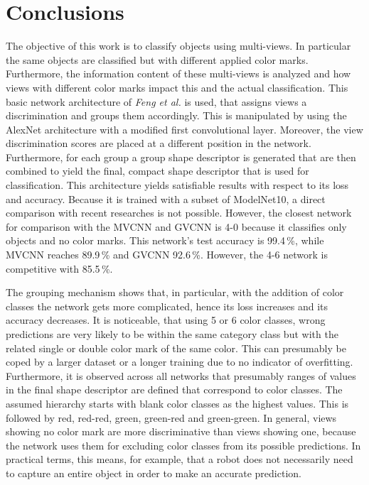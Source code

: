 \section{Conclusions}
\label{sec:discussion-conclusion}
The objective of this work is to classify objects using multi-views.
In particular the same objects are classified but with different applied color marks.
Furthermore, the information content of these multi-views is analyzed and how views with different color marks impact this and the actual classification.
This basic network architecture of \textit{Feng et al.} \cite{Feng2018} is used, that assigns views a discrimination and groups them accordingly.
This is manipulated by using the AlexNet architecture with a modified first convolutional layer.
Moreover, the view discrimination scores are placed at a different position in the network.
Furthermore, for each group a group shape descriptor is generated that are then combined to yield the final, compact shape descriptor that is used for classification.
This architecture yields satisfiable results with respect to its loss and accuracy.
Because it is trained with a subset of ModelNet10, a direct comparison with recent researches is not possible.
However, the closest network for comparison with the MVCNN and GVCNN is 4-0 because it classifies only objects and no color marks.
This network's test accuracy is 99.4\,\%, while MVCNN reaches 89.9\,\% and GVCNN 92.6\,\%.
However, the 4-6 network is competitive with 85.5\,\%.

The grouping mechanism shows that, in particular, with the addition of color classes the network gets more complicated, hence its loss increases and its accuracy decreases.
It is noticeable, that using 5 or 6 color classes, wrong predictions are very likely to be within the same category class but with the related single or double color mark of the same color.
This can presumably be coped by a larger dataset or a longer training due to no indicator of overfitting.
Furthermore, it is observed across all networks that presumably ranges of values in the final shape descriptor are defined that correspond to color classes.
The assumed hierarchy starts with blank color classes as the highest values.
This is followed by red, red-red, green, green-red and green-green.
In general, views showing no color mark are more discriminative than views showing one, because the network uses them for excluding color classes from its possible predictions.
In practical terms, this means, for example, that a robot does not necessarily need to capture an entire object in order to make an accurate prediction.